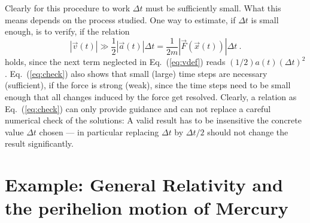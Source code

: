 \documentclass[12pt]{iopart}
\begin{document}
Clearly for this procedure to work $\Delta t$ must be sufficiently small. What this means depends on the process
studied. One way to estimate, if $\Delta t$ is small enough, is to verify, if the relation
\begin{equation}
|\vec v(t)| \gg \frac12|\vec a(t)|\Delta t = \frac{1}{2m} |\vec F(\vec x(t)) |\Delta t\ . 
\label{eq:check}
\end{equation}
holds, since the next term neglected in Eq.~(\ref{eq:vdef}) reads $(1/2)a(t)(\Delta t)^2$.  Eq.~({\ref{eq:check}})
also shows that small (large) time steps are necessary (sufficient), if the force is strong (weak), since
the time steps need to be small enough that all changes induced by the force get resolved. Clearly,
a relation as Eq.~({\ref{eq:check}}) can only provide guidance and can not replace a careful numerical check of
the solutions: A valid result has to be insensitive the concrete value $\Delta t$ chosen --- in particular replacing
$\Delta t$ by $\Delta t/2$ should not change the result significantly.


\section{Example: General Relativity and the perihelion motion of Mercury}
\end{document}
